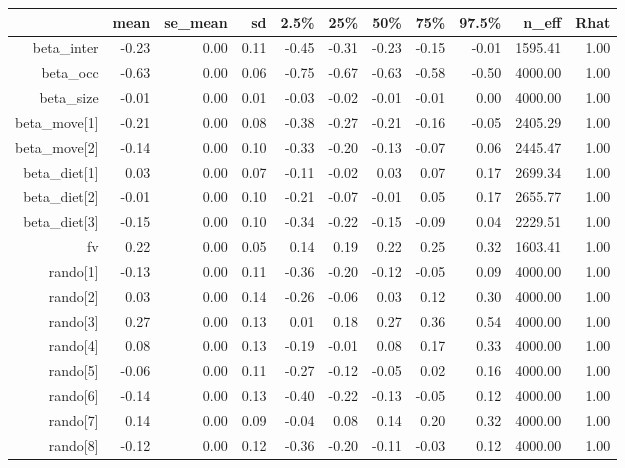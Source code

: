\begin{table}[ht]
\centering
\begin{tabular}{rrrrrrrrrrr}
  \hline
 & mean & se\_mean & sd & 2.5\% & 25\% & 50\% & 75\% & 97.5\% & n\_eff & Rhat \\ 
  \hline
beta\_inter & -0.23 & 0.00 & 0.11 & -0.45 & -0.31 & -0.23 & -0.15 & -0.01 & 1595.41 & 1.00 \\ 
  beta\_occ & -0.63 & 0.00 & 0.06 & -0.75 & -0.67 & -0.63 & -0.58 & -0.50 & 4000.00 & 1.00 \\ 
  beta\_size & -0.01 & 0.00 & 0.01 & -0.03 & -0.02 & -0.01 & -0.01 & 0.00 & 4000.00 & 1.00 \\ 
  beta\_move[1] & -0.21 & 0.00 & 0.08 & -0.38 & -0.27 & -0.21 & -0.16 & -0.05 & 2405.29 & 1.00 \\ 
  beta\_move[2] & -0.14 & 0.00 & 0.10 & -0.33 & -0.20 & -0.13 & -0.07 & 0.06 & 2445.47 & 1.00 \\ 
  beta\_diet[1] & 0.03 & 0.00 & 0.07 & -0.11 & -0.02 & 0.03 & 0.07 & 0.17 & 2699.34 & 1.00 \\ 
  beta\_diet[2] & -0.01 & 0.00 & 0.10 & -0.21 & -0.07 & -0.01 & 0.05 & 0.17 & 2655.77 & 1.00 \\ 
  beta\_diet[3] & -0.15 & 0.00 & 0.10 & -0.34 & -0.22 & -0.15 & -0.09 & 0.04 & 2229.51 & 1.00 \\ 
  fv & 0.22 & 0.00 & 0.05 & 0.14 & 0.19 & 0.22 & 0.25 & 0.32 & 1603.41 & 1.00 \\ 
  rando[1] & -0.13 & 0.00 & 0.11 & -0.36 & -0.20 & -0.12 & -0.05 & 0.09 & 4000.00 & 1.00 \\ 
  rando[2] & 0.03 & 0.00 & 0.14 & -0.26 & -0.06 & 0.03 & 0.12 & 0.30 & 4000.00 & 1.00 \\ 
  rando[3] & 0.27 & 0.00 & 0.13 & 0.01 & 0.18 & 0.27 & 0.36 & 0.54 & 4000.00 & 1.00 \\ 
  rando[4] & 0.08 & 0.00 & 0.13 & -0.19 & -0.01 & 0.08 & 0.17 & 0.33 & 4000.00 & 1.00 \\ 
  rando[5] & -0.06 & 0.00 & 0.11 & -0.27 & -0.12 & -0.05 & 0.02 & 0.16 & 4000.00 & 1.00 \\ 
  rando[6] & -0.14 & 0.00 & 0.13 & -0.40 & -0.22 & -0.13 & -0.05 & 0.12 & 4000.00 & 1.00 \\ 
  rando[7] & 0.14 & 0.00 & 0.09 & -0.04 & 0.08 & 0.14 & 0.20 & 0.32 & 4000.00 & 1.00 \\ 
  rando[8] & -0.12 & 0.00 & 0.12 & -0.36 & -0.20 & -0.11 & -0.03 & 0.12 & 4000.00 & 1.00 \\ 

\end{tabular}
\end{table}
